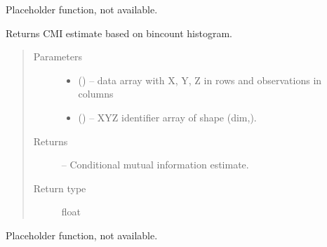 \documentclass[letterpaper,10pt,english]{sphinxmanual}
\begin{document}
\begin{fulllineitems}
\begin{fulllineitems}
\label{\detokenize{index:tigramite.independence_tests.CMIsymb.get_analytic_significance}}
Placeholder function, not available.

\end{fulllineitems}


\begin{fulllineitems}
\label{\detokenize{index:tigramite.independence_tests.CMIsymb.get_dependence_measure}}
Returns CMI estimate based on bincount histogram.
\begin{quote}\begin{description}
\item[{Parameters}] \leavevmode\begin{itemize}
\item {} 
 () -- data array with X, Y, Z in rows and observations in columns

\item {} 
 () -- XYZ identifier array of shape (dim,).

\end{itemize}

\item[{Returns}] \leavevmode
{} -- Conditional mutual information estimate.

\item[{Return type}] \leavevmode
float

\end{description}\end{quote}

\end{fulllineitems}


\begin{fulllineitems}
\label{\detokenize{index:tigramite.independence_tests.CMIsymb.get_model_selection_criterion}}
Placeholder function, not available.

\end{fulllineitems}


\end{fulllineitems}
\end{document}
